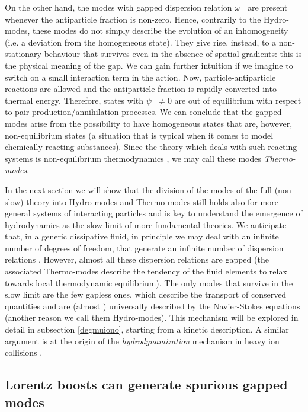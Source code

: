 \documentclass[a4paper, amsfonts, amssymb, amsmath, reprint, twocolumn, showkeys, nofootinbib]{revtex4-2}
\begin{document}
On the other hand, the modes with gapped dispersion relation $\omega_-$ are present whenever the antiparticle fraction is non-zero. 
Hence, contrarily to the Hydro-modes, these modes do not simply describe the evolution  of an inhomogeneity (i.e. a deviation from the homogeneous state). They give rise, instead, to a non-stationary behaviour that survives even in the absence of spatial gradients: this is the physical meaning of the gap. 
We can gain further intuition if we imagine to switch on a small interaction term in the action. Now, particle-antiparticle reactions are allowed and the antiparticle fraction is rapidly converted into thermal energy. Therefore, states with $\psi_- \neq 0$ are out of equilibrium with respect to pair production/annihilation processes. We can conclude that the gapped modes arise from the possibility to have homogeneous states that are, however, non-equilibrium states (a situation that is typical when it comes to model chemically reacting substances). Since the theory which deals with such reacting systems is non-equilibrium thermodynamics \citep{prigoginebook}, we may call these modes \textit{Thermo-modes}. 

In the next section we will show that the division of the modes of the full (non-slow) theory into Hydro-modes and Thermo-modes still holds also for more general systems of interacting particles and is key to understand the emergence of hydrodynamics as the slow limit of more fundamental theories. 
We anticipate that, in a generic dissipative fluid,  in principle we may  deal with an infinite number of degrees of freedom, that generate an infinite number of dispersion relations \citep{Denicol_Relaxation_2011}. 
However, almost all these dispersion relations are gapped (the associated Thermo-modes describe the tendency of the fluid elements to relax towards local thermodynamic equilibrium). The only modes that survive in the slow limit are the few gapless ones, which describe the transport of conserved quantities \cite{Glorioso2018} and are (almost \cite{jain_kovtun_2020arXiv}) universally described by the Navier-Stokes equations (another reason we call them Hydro-modes). This mechanism will be explored in detail in subsection \ref{degmuiono}, starting from a kinetic description. 
A similar argument is at the origin of the \textit{hydrodynamization} mechanism in heavy ion collisions \citep{FlorkowskiReview2018}. 

\subsection{Lorentz boosts can generate spurious gapped modes}\label{spuriii}
\end{document}

